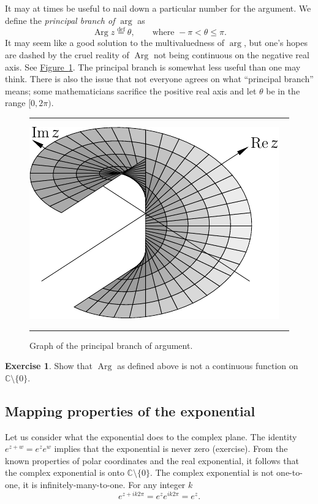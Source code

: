 \documentclass[12pt,openany]{book}
\newcommand{\Arg}{\operatorname{Arg}}
\newcommand{\C}{{\mathbb{C}}}
\newcommand{\myindex}[1]{#1\index{#1}}
\theoremstyle{plain}
\theoremstyle{remark}
\theoremstyle{definition}
\newenvironment{exbox}{%
    \def\FrameCommand{\vrule width 1pt \relax\hspace {10pt}}%
    \MakeFramed {\advance \hsize -\width \FrameRestore }%
}{%
    \endMakeFramed
}
\newenvironment{myfig}{%
\begin{figure}[h!t]
\noindent\rule{\textwidth}{0.4pt}\vspace{12pt}\par\centering}%
{\par\noindent\rule{\textwidth}{0.4pt}
\end{figure}}
\theoremstyle{exercise}
\newtheorem{exercise}{Exercise}[section]
\theoremstyle{example}
\newcommand{\figureref}[1]{\hyperref[#1]{Figure~\ref*{#1}}}
\begin{document}
It may at times be useful to nail down a particular number for the argument.
We define the \emph{\myindex{principal branch of $\arg$}} as
\begin{equation*}
\Arg z
\overset{\text{def}}{=}
\theta, \qquad \text{where } -\pi < \theta \leq \pi.
\end{equation*}
It may seem like a good solution to the multivaluedness of $\arg$, but
one's hopes are dashed by the cruel reality of $\Arg$ not being continuous
on the negative real axis.  See \figureref{fig:arggraph}.
The principal branch is somewhat less useful than one may think.
There is also the issue that not everyone agrees
on what ``principal branch'' means; some mathematicians sacrifice the
positive real axis and let $\theta$ be in the range $[0,2\pi)$.

\begin{myfig}
\includegraphics{figures/arggraph}
\caption{Graph of the principal branch of argument.\label{fig:arggraph}}
\end{myfig}

\begin{exbox}
\begin{exercise}
Show that $\Arg$ as defined above is not a continuous function on 
$\C \setminus \{ 0 \}$.
\end{exercise}
\end{exbox}

\subsection{Mapping properties of the exponential}

Let us consider what the exponential does to the complex plane.
The identity $e^{z+w} = e^z e^w$ implies that the exponential
is never zero (exercise).
From the known properties of polar coordinates
and the real exponential, it follows that the complex exponential is
onto $\C \setminus \{ 0 \}$.
The complex exponential is not one-to-one, it is 
infinitely-many-to-one.  For any integer $k$
\begin{equation*}
e^{z+ik2\pi} = 
e^{z} e^{ik2\pi} =
e^z .
\end{equation*}
\end{document}
